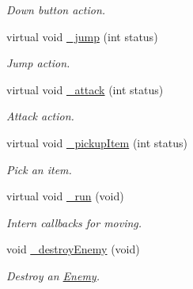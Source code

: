\begin{DoxyCompactItemize}
\begin{DoxyCompactList}\small\item\em Down button action. \end{DoxyCompactList}\item 
virtual void \hyperlink{class_characters_afad45a33b0277605c50b90031371e00a}{\-\_\-jump} (int status)
\begin{DoxyCompactList}\small\item\em Jump action. \end{DoxyCompactList}\item 
virtual void \hyperlink{class_characters_a9ff6c76cd02e53019e15801e9c76a719}{\-\_\-attack} (int status)
\begin{DoxyCompactList}\small\item\em Attack action. \end{DoxyCompactList}\item 
virtual void \hyperlink{class_characters_aee824830a67177342ae606f959fb0c7a}{\-\_\-pickup\-Item} (int status)
\begin{DoxyCompactList}\small\item\em Pick an item. \end{DoxyCompactList}\item 
virtual void \hyperlink{class_characters_aa59e298bef3e58fc7c82deb86e762200}{\-\_\-run} (void)
\begin{DoxyCompactList}\small\item\em Intern callbacks for moving. \end{DoxyCompactList}\item 
void \hyperlink{class_characters_a98666bfdc74679e0ab605a4f6a89ecb2}{\-\_\-destroy\-Enemy} (void)
\begin{DoxyCompactList}\small\item\em Destroy an \hyperlink{class_enemy}{Enemy}. \end{DoxyCompactList}\end{DoxyCompactItemize}
